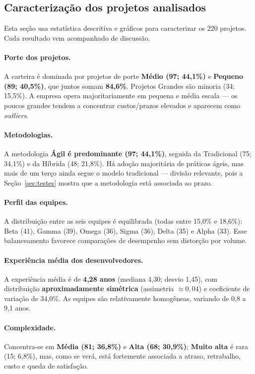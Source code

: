 \documentclass[a4paper, 12pt]{article}
\begin{document}
\subsection{Caracterização dos projetos analisados}
\label{sec:caracterizacao}

Esta seção usa estatística descritiva e gráficos para caracterizar os 220
projetos. Cada resultado vem acompanhado de discussão.

\paragraph{Porte dos projetos.}
A carteira é dominada por projetos de porte \textbf{Médio (97; 44,1\%)} e
\textbf{Pequeno (89; 40,5\%)}, que juntos somam \textbf{84,6\%}. Projetos
Grandes são minoria (34; 15,5\%). A empresa opera majoritariamente em pequena e
média escala --- os poucos grandes tendem a concentrar custos/prazos elevados e
aparecem como \emph{outliers}.

\paragraph{Metodologias.}
A metodologia \textbf{Ágil é predominante (97; 44,1\%)}, seguida da Tradicional
(75; 34,1\%) e da Híbrida (48; 21,8\%). Há adoção majoritária de práticas ágeis,
mas mais de um terço ainda segue o modelo tradicional --- divisão relevante,
pois a Seção~\ref{sec:testes} mostra que a metodologia está associada ao prazo.

\paragraph{Perfil das equipes.}
A distribuição entre as seis equipes é equilibrada (todas entre 15,0\% e 18,6\%):
Beta (41), Gamma (39), Omega (36), Sigma (36), Delta (35) e Alpha (33). Esse
balanceamento favorece comparações de desempenho sem distorção por volume.

\paragraph{Experiência média dos desenvolvedores.}
A experiência média é de \textbf{4,28 anos} (mediana 4,30; desvio 1,45), com
distribuição \textbf{aproximadamente simétrica} (assimetria $\approx 0{,}04$) e
coeficiente de variação de 34,0\%. As equipes são relativamente homogêneas,
variando de 0,8 a 9,1 anos.

\paragraph{Complexidade.}
Concentra-se em \textbf{Média (81; 36,8\%)} e \textbf{Alta (68; 30,9\%)};
\textbf{Muito alta} é rara (15; 6,8\%), mas, como se verá, está fortemente
associada a atraso, retrabalho, custo e queda de satisfação.
\end{document}
